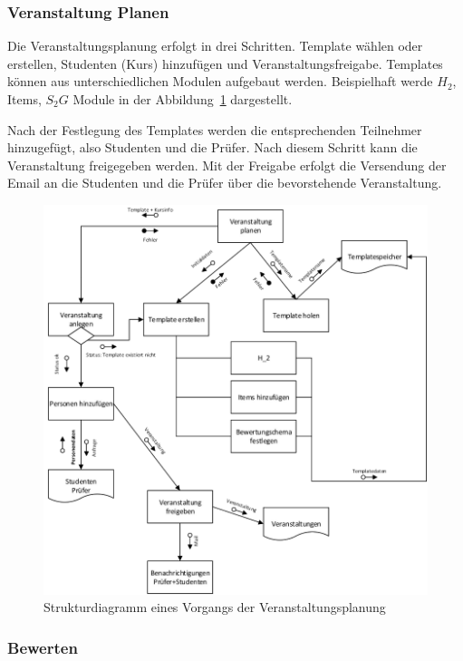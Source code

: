 \begin{appendix}
	\clearpage
	\subsubsection{Veranstaltung Planen}
	Die Veranstaltungsplanung erfolgt in drei Schritten. Template wählen oder erstellen, Studenten (Kurs) hinzufügen und Veranstaltungsfreigabe. Templates können aus unterschiedlichen Modulen aufgebaut werden. Beispielhaft werde $H_2$, Items, $S_2G$ Module in der Abbildung~\ref{fig:sd_veranst_planen} dargestellt. 
	
	Nach der Festlegung des Templates werden die entsprechenden Teilnehmer hinzugefügt, also Studenten und die Prüfer. Nach diesem Schritt kann die Veranstaltung freigegeben werden. Mit der Freigabe erfolgt die Versendung der Email an die Studenten und die Prüfer über die bevorstehende Veranstaltung.

		\begin{figure}[H]
			\centering
			\includegraphics[width=\textwidth]{./img/sd_veranst_planen}
			\caption{Strukturdiagramm eines Vorgangs der Veranstaltungsplanung}
			\label{fig:sd_veranst_planen}
		\end{figure}
	\clearpage
	\subsubsection{Bewerten}
	

\end{appendix}
